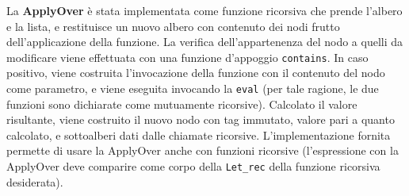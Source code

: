 \documentclass[a4paper,12pt]{article}
\begin{document}
 La \textbf{ApplyOver} è stata implementata come funzione ricorsiva che prende l'albero e la lista, e restituisce un nuovo albero con contenuto dei nodi frutto dell'applicazione della funzione. La verifica dell'appartenenza del nodo a quelli da modificare viene effettuata con una funzione d'appoggio \texttt{contains}. In caso positivo, viene costruita l'invocazione della funzione con il contenuto del nodo come parametro, e viene eseguita invocando la \texttt{eval} (per tale ragione, le due funzioni sono dichiarate come mutuamente ricorsive). Calcolato il valore risultante, viene costruito il nuovo nodo con tag immutato, valore pari a quanto calcolato, e sottoalberi dati dalle chiamate ricorsive. L'implementazione fornita permette di usare la ApplyOver anche con funzioni ricorsive (l'espressione con la ApplyOver deve comparire come corpo della \texttt{Let\_rec} della funzione ricorsiva desiderata).
 
\end{document}
